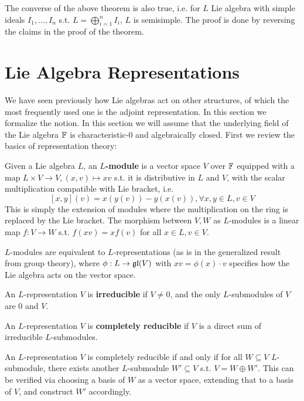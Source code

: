 \documentclass{article}
\begin{document}
\begin{corollary}
    The converse of the above theorem is also true, i.e. for $L$ Lie algebra with simple ideals $I_1, \dots, I_n$ s.t. $L = \bigoplus_{i = 1}^n I_i$, $L$ is semisimple. The proof is done by reversing the claims in the proof of the theorem.
\end{corollary}

\section{Lie Algebra Representations}

\textstart
We have seen previously how Lie algebras act on other structures, of which the most frequently used one is the adjoint representation. In this section we formalize the notion. In this section we will assume that the underlying field of the Lie algebra $\mathbb{F}$ is characteristic-0 and algebraically closed. First we review the basics of representation theory:

\begin{definition}
    Given a Lie algebra $L$, an \textbf{$L$-module} is a vector space $V$ over $\mathbb{F}$ equipped with a map $L \times V \to V, (x, v) \mapsto xv$ s.t. it is distributive in $L$ and $V$, with the scalar multiplication compatible with Lie bracket, i.e.
    \[
        [x, y](v) = x(y(v)) - y(x(v)), \forall x, y \in L, v \in V
    \]
    This is simply the extension of modules where the multiplication on the ring is replaced by the Lie bracket. The morphism between $V, W$ as $L$-modules is a linear map $f: V \to W$ s.t. $f(xv) = xf(v)$ for all $x \in L, v \in V$.
\end{definition}
\nogap
\begin{remark}
    $L$-modules are equivalent to $L$-representations (as is in the generalized result from group theory), where $\phi: L \to \mathfrak{gl}(V)$ with $xv = \phi(x) \cdot v$ specifies how the Lie algebra acts on the vector space.
\end{remark}

\begin{definition}[Irreducible]
    An $L$-representation $V$ is \textbf{irreducible} if $V \neq 0$, and the only $L$-submodules of $V$ are 0 and $V$.
\end{definition}
\nogap
\begin{definition}
    An $L$-representation $V$ is \textbf{completely reducible} if $V$ is a direct sum of irreducible $L$-submodules.
\end{definition}
\nogap
\begin{remark}
    An $L$-representation $V$ is completely reducible if and only if for all $W \subseteq V$ $L$-submodule, there exists another $L$-submodule $W' \subseteq V$ s.t. $V = W \oplus W'$. This can be verified via choosing a basis of $W$ as a vector space, extending that to a basis of $V$, and construct $W'$ accordingly. 
\end{remark}
\end{document}
